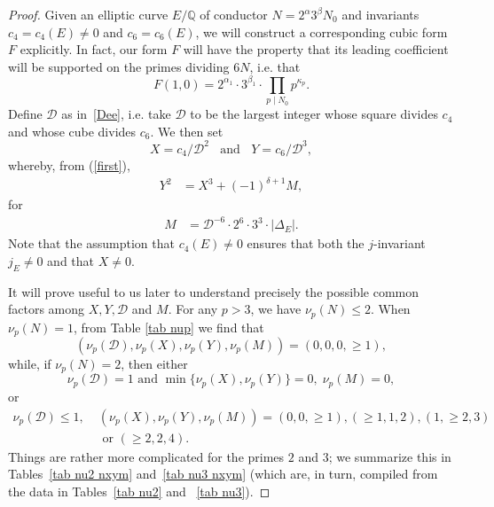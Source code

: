 \begin{proof}
Given an elliptic curve $E/\mathbb{Q}$ of conductor $N=2^\alpha 3^\beta N_0$ and invariants $c_4= c_4(E) \neq 0$ and 
$c_6=c_6(E)$, we will construct a corresponding cubic form $F$ explicitly. In fact, our form $F$ will have the property that its leading coefficient will be supported on the primes dividing $6N$, i.e. that
$$
F(1,0) = 2^{\alpha_1} \cdot 3^{\beta_1} \cdot \prod_{p \mid N_0} p^{\kappa_p}.
$$
Define $\mathcal{D}$ as in~\eqref{Dee}, i.e. take 
$\mathcal{D}$ to be the largest integer whose square divides $c_4$ and whose cube divides $c_6$. We then set 
$$
X = c_4/\mathcal{D}^2 \; \; \mbox{ and } \; \; Y = c_6/\mathcal{D}^3,
$$
whereby, from (\ref{first}),
\begin{align} \label{first2}
Y^2 &= X^3 + (-1)^{\delta +1}  M,
\end{align}
for
\begin{align*}
M &=\mathcal{D}^{-6} \cdot 2^6 \cdot 3^3 \cdot |\Delta_E|.
\end{align*}
Note that the assumption that $c_4(E) \neq 0$ ensures that both the $j$-invariant $j_E \neq 0$ and that $X \neq 0$.

It will prove useful to us later to understand precisely the possible common factors among $X, Y, \mathcal{D}$ and $M$.
For any $p>3$, we have $\nu_p(N) \leq 2$. When 
$\nu_p(N)=1$, from Table \ref{tab nup} we find that
\begin{equation} \label{super-1}
( \nu_p (\mathcal{D}), \nu_p (X), \nu_p (Y), \nu_p (M)) = (0,0,0, \geq 1),
\end{equation}
while, if $\nu_p (N)=2$, then either 
\begin{equation} \label{super0}
\nu_p (\mathcal{D}) = 1 \mbox{ and }  \min \{ \nu_p (X), \nu_p (Y) \} = 0, \; \nu_p (M)=0 ,
\end{equation}
or
%
\begin{align} \label{super}
\nu_p (\mathcal{D}) \leq 1, \;
&(\nu_p (X), \nu_p (Y), \nu_p (M) ) = (0,0, \geq 1), (\geq 1, 1, 2), (1, \geq 2, 3) \\
&\mbox{ or } (\geq 2, 2, 4).
\end{align}
Things are rather more complicated for the primes $2$ and $3$; we summarize this in Tables~\ref{tab nu2 nxym} and~\ref{tab nu3 
nxym} (which are, in turn, compiled from the data in Tables~\ref{tab nu2} and ~\ref{tab nu3}). 


\end{proof}
